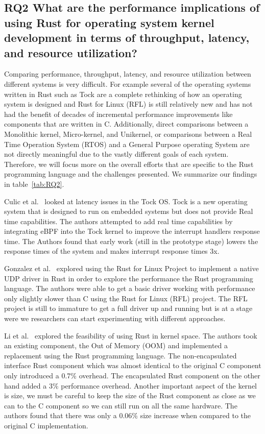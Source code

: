 \documentclass[sigconf]{acmart}
\begin{document}
\subsection{RQ2  What are the performance implications of using Rust for operating system
      kernel development in terms of throughput, latency, and resource utilization?}

Comparing performance, throughput, latency, and resource utilization between different systems is very difficult. For example several of the operating systems written in Rust such as Tock are a complete rethinking of how an operating system is designed and Rust for Linux (RFL) is still relatively new and has not had the benefit of decades of incremental performance improvements like components that are written in C. Additionally, direct comparisons between a Monolithic kernel, Micro-kernel, and Unikernel, or comparisons between a Real Time Operation System (RTOS) and a General Purpose operating System are not directly meaningful due to the vastly different goals of each system. Therefore, we will focus more on the overall efforts that are specific to the Rust programming language and the challenges presented. We summarize our findings in table~\ref{tab:RQ2}.

Culic et al.~\cite{Culic2022-bk} looked at latency issues in the Tock OS. Tock is a new operating system that is designed to run on embedded systems but does not provide Real time capabilities. The authors attempted to add real time capabilities by integrating eBPF into the Tock kernel to improve the interrupt handlers response time. The Authors found that early work (still in the prototype stage) lowers the response times of the system and makes interrupt response times 3x.

Gonzalez et al.~\cite{Gonzalez2023-ek} explored using the Rust for Linux Project to implement a native UDP driver in Rust in order to explore the performance the Rust programming language. The authors were able to get a basic driver working with performance only slightly slower than C using the Rust for Linux (RFL) project. The RFL project is still to immature to get a full driver up and running but is at a stage were we researchers can start experimenting with different approaches.

Li et al.~\cite{Li2024-be} explored the feasibility of using Rust in kernel space. The authors took an existing component, the Out of Memory (OOM) and implemented a replacement using the Rust programming language. The non-encapsulated interface Rust component which was almost identical to the original C component only introduced a 0.7\% overhead. The encapsulated Rust component on the other hand added a 3\% performance overhead. Another important aspect of the kernel is size, we must be careful to keep the size of the Rust component as close as we can to the C component so we can still run on all the same hardware. The authors found that there was only a 0.06\% size increase when compared to the original C implementation.
\end{document}
